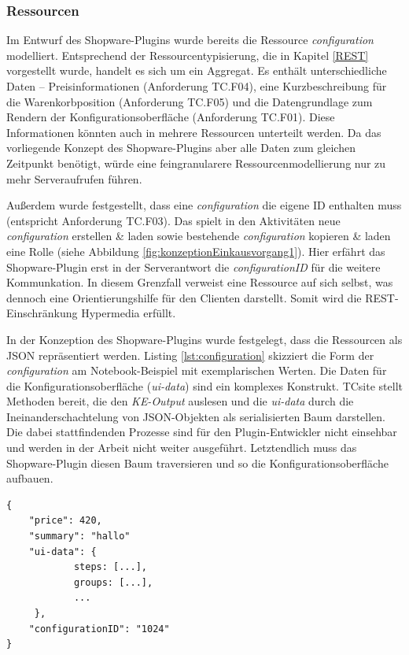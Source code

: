 \documentclass[11pt, a4paper, titlepage, listof=totoc, bibliography=totoc, index=totoc, twoside, openright, headings=normal, draft]{scrreprt}
\begin{document}
\subsubsection{Ressourcen}
Im Entwurf des Shopware-Plugins wurde bereits die Ressource \emph{configuration} modelliert. Entsprechend der Ressourcentypisierung, die in Kapitel \ref{REST} vorgestellt wurde, handelt es sich um ein Aggregat. Es enthält unterschiedliche Daten -- Preisinformationen (Anforderung TC.F04), eine Kurzbeschreibung für die Warenkorbposition (Anforderung TC.F05) und die Datengrundlage zum Rendern der Konfigurationsoberfläche (Anforderung TC.F01). Diese Informationen könnten auch in mehrere Ressourcen unterteilt werden. Da das vorliegende Konzept des Shopware-Plugins aber alle Daten zum gleichen Zeitpunkt benötigt, würde eine feingranularere Ressourcenmodellierung nur zu mehr Serveraufrufen führen.

Außerdem wurde festgestellt, dass eine \emph{configuration} die eigene ID enthalten muss (entspricht Anforderung TC.F03). Das spielt in den Aktivitäten \glqq neue \emph{configuration} erstellen \& laden\grqq{}  sowie \glqq bestehende \emph{configuration} kopieren \& laden\grqq{} eine Rolle (siehe Abbildung \ref{fig:konzeptionEinkausvorgang1}). Hier erfährt das Shopware-Plugin erst in der Serverantwort die \emph{configurationID} für die weitere Kommunkation. In diesem Grenzfall verweist eine Ressource auf sich selbst, was dennoch eine Orientierungshilfe für den Clienten darstellt. Somit wird die REST-Einschränkung \glqq Hypermedia\grqq{} erfüllt.

In der Konzeption des Shopware-Plugins wurde festgelegt, dass die Ressourcen als JSON repräsentiert werden. Listing \ref{lst:configuration} skizziert die Form der \emph{configuration} am Notebook-Beispiel mit exemplarischen Werten. Die Daten für die Konfigurationsoberfläche (\emph{ui-data}) sind ein komplexes Konstrukt. TCsite stellt Methoden bereit, die den \emph{KE-Output} auslesen und die \emph{ui-data} durch die Ineinanderschachtelung von JSON-Objekten als serialisierten Baum darstellen. Die dabei stattfindenden Prozesse sind für den Plugin-Entwickler nicht einsehbar und werden in der Arbeit nicht weiter ausgeführt. Letztendlich muss das Shopware-Plugin diesen Baum traversieren und so die Konfigurationsoberfläche aufbauen.

\vspace{1em}
\begin{lstlisting}[caption=Beispiel einer \emph{configuration}, label=lst:configuration]
{
	"price": 420,
	"summary": "hallo"
	"ui-data": {
			steps: [...],
			groups: [...],
			...
	 },
	"configurationID": "1024"
}
\end{lstlisting}
\end{document}
